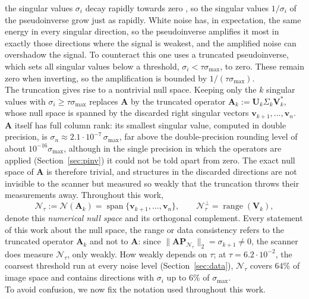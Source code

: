 \documentclass{article}
\numberwithin{equation}{section}
\newcommand{\SMINREL}{2.1\cdot10^{-7}}
\begin{document}
the singular values $\sigma_i$ decay rapidly towards zero \parencite{louis1986incomplete}, so the singular values $1/\sigma_i$ of the pseudoinverse grow just as rapidly.
White noise has, in expectation, the same energy in every singular direction, so the pseudoinverse amplifies it most in exactly those directions where the signal is weakest,
and the amplified noise can overshadow the signal. To counteract this one uses a truncated pseudoinverse, which sets all singular values below a threshold,
$\sigma_i<\tau\sigma_{\max}$, to zero. These remain zero when inverting, so the amplification is bounded by $1/(\tau\sigma_{\max})$.\\
The truncation gives rise to a nontrivial null space. Keeping only the $k$ singular values with
$\sigma_i\geq\tau\sigma_{\max}$ replaces $\mathbf{A}$ by the truncated operator
$\mathbf{A}_k:=\mathbf{U}_k\Sigma_k\mathbf{V}_k^{*}$, whose null space is spanned by the discarded right
singular vectors $\mathbf{v}_{k+1},\dots,\mathbf{v}_n$. $\mathbf{A}$ itself has full column rank: its
smallest singular value, computed in double precision, is $\sigma_n\approx\SMINREL\,\sigma_{\max}$, far
above the double-precision rounding level of about $10^{-16}\sigma_{\max}$, although in the single
precision in which the operators are applied (Section~\ref{sec:pinv}) it could not be told apart from
zero. The exact null space of $\mathbf{A}$ is therefore trivial, and structures in the discarded
directions are not invisible to the scanner but measured so weakly that the truncation throws their
measurements away. Throughout this work,
\[\mathcal{N}_\tau:=\mathcal{N}(\mathbf{A}_k)=\operatorname{span}\{\mathbf{v}_{k+1},\dots,\mathbf{v}_n\},
\qquad \mathcal{N}_\tau^\perp=\operatorname{range}(\mathbf{V}_k),\]
denote this \emph{numerical null space} and its orthogonal complement. Every statement of this work about
the null space, the range or data consistency refers to the truncated operator $\mathbf{A}_k$ and not to
$\mathbf{A}$: since $\lVert\mathbf{A}\mathbf{P}_{\mathcal{N}_\tau}\rVert_2=\sigma_{k+1}\neq0$, the
scanner does measure $\mathcal{N}_\tau$, only weakly. How weakly depends on $\tau$; at $\tau=6.2\cdot10^{-2}$, the
coarsest threshold run at every noise level (Section~\ref{sec:data}), $\mathcal{N}_\tau$ covers $64\%$ of image space and contains directions with $\sigma_i$ up to $6\%$ of
$\sigma_{\max}$.\\
To avoid confusion, we now fix the notation used throughout this work. 
\end{document}
